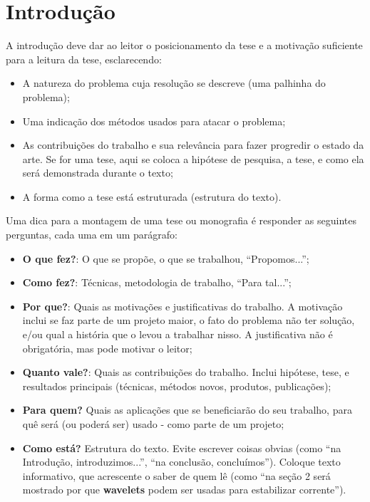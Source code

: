 \chapter{Introdução}
\label{cap:capitulo1}

A introdução deve dar ao leitor o posicionamento da tese e a motivação suficiente para a leitura da tese, esclarecendo:
\begin{itemize}
	\item A natureza do problema cuja resolução se descreve (uma palhinha do problema);
	\item Uma indicação dos métodos usados para atacar o problema;
	\item As contribuições do trabalho e sua relevância para fazer progredir o estado da arte. Se for uma tese, aqui se coloca a hipótese de pesquisa, a tese, e como ela será demonstrada durante o texto;
	\item A forma como a tese está estruturada (estrutura do texto).
\end{itemize}

Uma dica para a montagem de uma tese ou monografia é responder as seguintes perguntas, cada uma em um parágrafo:
\begin{itemize}
	\item \textbf{O que fez?}: O que se propõe, o que se trabalhou, ``Propomos...'';
	\item \textbf{Como fez?}: Técnicas, metodologia de trabalho, ``Para tal...'';
	\item \textbf{Por que?}: Quais as motivações e justificativas do trabalho. A motivação inclui se faz parte de um projeto maior, o fato do problema não ter solução, e/ou qual a história que o levou a trabalhar nisso. A justificativa não é obrigatória, mas pode motivar o leitor;
	\item \textbf{Quanto vale?}: Quais as contribuições do trabalho. Inclui hipótese, tese,  e resultados principais (técnicas, métodos novos, produtos, publicações);
	\item \textbf{Para quem?} Quais as aplicações que se beneficiarão do seu trabalho, para quê será (ou poderá ser) usado - como parte de um projeto;
	\item \textbf{Como está?} Estrutura do texto. Evite escrever coisas obvias (como ``na Introdução, introduzimos...'', ``na conclusão, concluímos''). Coloque texto informativo, que acrescente o saber de quem lê (como ``na seção 2 será mostrado por que \textbf{wavelets} podem ser usadas para estabilizar corrente'').
\end{itemize}

